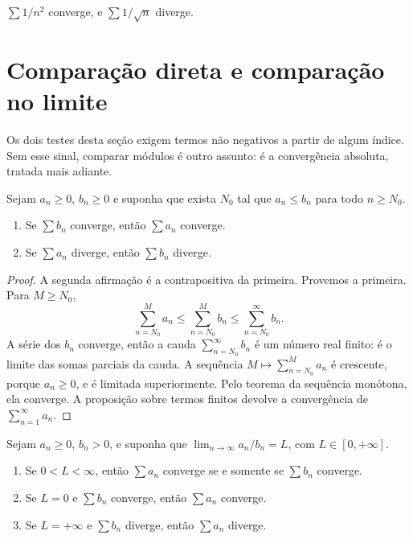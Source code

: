 \documentclass[11pt,a4paper]{article}
\begin{document}
\begin{corolario}
\(\sum 1/n^2\) converge, e \(\sum 1/\sqrt{n}\) diverge.
\end{corolario}

\section{Comparação direta e comparação no limite}

Os dois testes desta seção exigem termos não negativos a partir de algum índice. Sem esse sinal, comparar módulos é outro assunto: é a convergência absoluta, tratada mais adiante.

\begin{teorema}
Sejam \(a_n\ge 0\), \(b_n\ge 0\) e suponha que exista \(N_0\) tal que \(a_n\le b_n\) para todo \(n\ge N_0\).
\begin{enumerate}
\item Se \(\sum b_n\) converge, então \(\sum a_n\) converge.
\item Se \(\sum a_n\) diverge, então \(\sum b_n\) diverge.
\end{enumerate}
\end{teorema}

\begin{proof}
A segunda afirmação é a contrapositiva da primeira. Provemos a primeira. Para \(M\ge N_0\),
\[
\sum_{n=N_0}^{M} a_n\le\sum_{n=N_0}^{M} b_n\le\sum_{n=N_0}^{\infty} b_n.
\]
A série dos \(b_n\) converge, então a cauda \(\sum_{n=N_0}^\infty b_n\) é um número real finito: é o limite das somas parciais da cauda. A sequência \(M\mapsto\sum_{n=N_0}^{M} a_n\) é crescente, porque \(a_n\ge 0\), e é limitada superiormente. Pelo teorema da sequência monótona, ela converge. A proposição sobre termos finitos devolve a convergência de \(\sum_{n=1}^\infty a_n\).
\end{proof}

\begin{teorema}
Sejam \(a_n\ge 0\), \(b_n>0\), e suponha que \(\lim_{n\to\infty} a_n/b_n=L\), com \(L\in[0,+\infty]\).
\begin{enumerate}
\item Se \(0<L<\infty\), então \(\sum a_n\) converge se e somente se \(\sum b_n\) converge.
\item Se \(L=0\) e \(\sum b_n\) converge, então \(\sum a_n\) converge.
\item Se \(L=+\infty\) e \(\sum b_n\) diverge, então \(\sum a_n\) diverge.
\end{enumerate}
\end{teorema}
\end{document}
